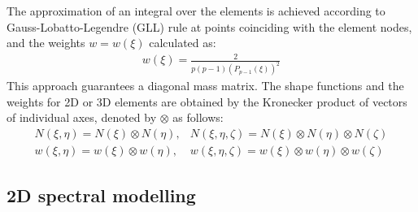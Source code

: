 \documentclass[a4paper,12pt]{article}
\begin{document}
{The approximation of an integral over the elements is achieved according to Gauss-Lobatto-Legendre (GLL) rule at points coinciding with the element nodes, 
and the weights \(w=w(\xi)\) calculated as:
\begin{eqnarray}
{w(\xi)} = \frac{2}{p(p-1)(P_{p-1}(\xi))^2}
\label{eq:weights}
\end{eqnarray}
This approach guarantees a diagonal mass matrix.
The shape functions and the weights for 2D or 3D elements are obtained by the Kronecker product of vectors of individual axes, denoted by \(\otimes\) as follows:
\begin{eqnarray}
N(\xi,\eta) = N(\xi)\otimes N(\eta), & N(\xi,\eta,\zeta) = N(\xi)\otimes N(\eta)\otimes N(\zeta) \nonumber\\
w(\xi,\eta) = w(\xi)\otimes w(\eta), & w(\xi,\eta,\zeta) = w(\xi)\otimes w(\eta)\otimes w(\zeta) 
\label{eq:3Dshape_weights}
\end{eqnarray}
\subsection{2D spectral modelling}
\label{sec:2D_SEM}

}
\end{document}
